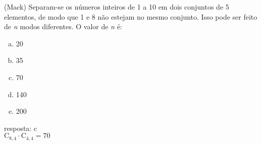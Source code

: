 \begin{ex}
 	(Mack) Separam-se os números inteiros de 1 a 10 em dois conjuntos de 5 elementos, de modo que 1 e 8 não estejam no mesmo conjunto. Isso pode ser feito de \textit{n} modos diferentes. O valor de \textit{n} é:
    \begin{enumerate}[(a)]
    \item 20
    \item 35
    \item 70
    \item 140
    \item 200
    \end{enumerate}
      \begin{sol}
       resposta: c \\
       $\mathrm{C}_{8,4}\cdot\mathrm{C}_{4,4}= 70$
      \end{sol}
\end{ex}